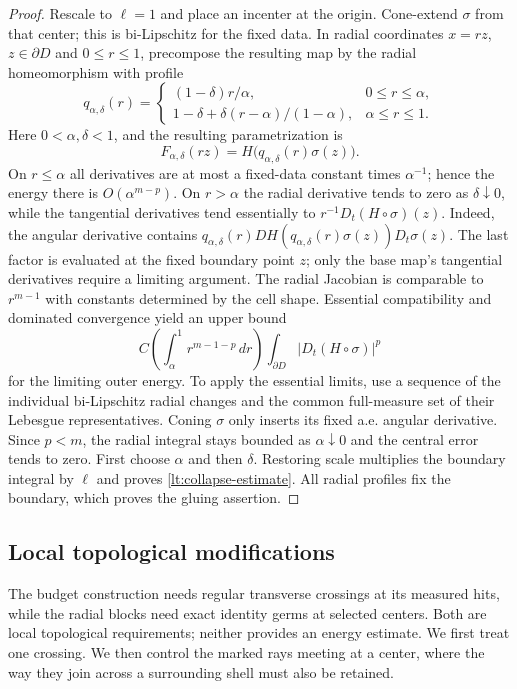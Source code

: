 \documentclass[11pt]{article}
\numberwithin{equation}{section}
\theoremstyle{definition}
\theoremstyle{remark}
\begin{document}
\begin{proof}
Rescale to $\ell=1$ and place an incenter at the origin. Cone-extend
$\sigma$ from that center; this is bi-Lipschitz for the fixed data.
In radial coordinates
$x=rz$, $z\in\partial D$ and $0\leq r\leq1$, precompose the
resulting map by the radial homeomorphism with profile
\[
 q_{\alpha,\delta}(r)=
 \begin{cases}
 (1-\delta)r/\alpha,&0\leq r\leq\alpha,\\
 1-\delta+\delta(r-\alpha)/(1-\alpha),&\alpha\leq r\leq1.
 \end{cases}
\]
Here $0<\alpha,\delta<1$, and the resulting parametrization is
\[
 F_{\alpha,\delta}(rz)
       =H\bigl(q_{\alpha,\delta}(r)\sigma(z)\bigr).
\]
On $r\leq\alpha$ all derivatives are
at most a fixed-data constant times $\alpha^{-1}$; hence the energy
there is $O(\alpha^{m-p})$.  On $r>\alpha$ the radial derivative
tends to zero as $\delta\downarrow0$, while the tangential derivatives
tend essentially to $r^{-1}D_t(H\circ\sigma)(z)$. Indeed, the
angular derivative contains
$q_{\alpha,\delta}(r)DH(q_{\alpha,\delta}(r)\sigma(z))D_t\sigma(z)$.
The last factor is evaluated at the fixed boundary point $z$;
only the base map's tangential derivatives require a limiting
argument. The radial
Jacobian is comparable to $r^{m-1}$ with constants determined by the
cell shape.  Essential compatibility and dominated convergence yield
an upper bound
\[
 C\left(\int_\alpha^1r^{m-1-p}\,dr\right)
                      \int_{\partial D}|D_t(H\circ\sigma)|^p
\]
for the limiting outer energy.  To apply the essential limits, use a
sequence of the individual bi-Lipschitz radial changes and the common
full-measure set of their Lebesgue representatives.  Coning $\sigma$
only inserts its fixed a.e. angular derivative.  Since $p<m$, the
radial integral stays bounded as $\alpha\downarrow0$ and the central
error tends to zero.  First choose $\alpha$ and then $\delta$.
Restoring scale multiplies the boundary integral by $\ell$ and proves
\eqref{lt:collapse-estimate}.  All radial profiles fix the boundary,
which proves the gluing assertion.
\end{proof}

\subsection{Local topological modifications}\label{lt:local-topology}

The budget construction needs regular transverse crossings at its
measured hits, while the radial blocks need exact identity germs at
selected centers. Both are local topological requirements; neither
provides an energy estimate. We first treat one crossing. We then
control the marked rays meeting at a center, where the way they join
across a surrounding shell must also be retained.
\end{document}
